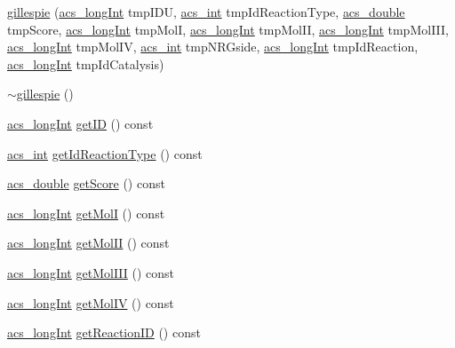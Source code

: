 \begin{DoxyCompactItemize}
\item 
\hyperlink{a00014_a0a38f4fd563208beba389f7f8e8eed4a}{gillespie} (\hyperlink{a00050_a19319d75f02db4308bc5c0026d98cd85}{acs\+\_\+long\+Int} tmp\+I\+D\+U, \hyperlink{a00050_a8d277355641a098190360234e2ebde35}{acs\+\_\+int} tmp\+Id\+Reaction\+Type, \hyperlink{a00050_ab776853a005fcbf56af0424a2a4dd607}{acs\+\_\+double} tmp\+Score, \hyperlink{a00050_a19319d75f02db4308bc5c0026d98cd85}{acs\+\_\+long\+Int} tmp\+Mol\+I, \hyperlink{a00050_a19319d75f02db4308bc5c0026d98cd85}{acs\+\_\+long\+Int} tmp\+Mol\+I\+I, \hyperlink{a00050_a19319d75f02db4308bc5c0026d98cd85}{acs\+\_\+long\+Int} tmp\+Mol\+I\+I\+I, \hyperlink{a00050_a19319d75f02db4308bc5c0026d98cd85}{acs\+\_\+long\+Int} tmp\+Mol\+I\+V, \hyperlink{a00050_a8d277355641a098190360234e2ebde35}{acs\+\_\+int} tmp\+N\+R\+Gside, \hyperlink{a00050_a19319d75f02db4308bc5c0026d98cd85}{acs\+\_\+long\+Int} tmp\+Id\+Reaction, \hyperlink{a00050_a19319d75f02db4308bc5c0026d98cd85}{acs\+\_\+long\+Int} tmp\+Id\+Catalysis)
\item 
\hyperlink{a00014_a33a97651932d8f82d82d164c94a2eae7}{$\sim$gillespie} ()
\item 
\hyperlink{a00050_a19319d75f02db4308bc5c0026d98cd85}{acs\+\_\+long\+Int} \hyperlink{a00014_a6aba3b283efc955bd4869f663ab877d6}{get\+I\+D} () const 
\item 
\hyperlink{a00050_a8d277355641a098190360234e2ebde35}{acs\+\_\+int} \hyperlink{a00014_a25d1e86363cdd7fabbb624b85620d1db}{get\+Id\+Reaction\+Type} () const 
\item 
\hyperlink{a00050_ab776853a005fcbf56af0424a2a4dd607}{acs\+\_\+double} \hyperlink{a00014_aa0ba52c30f6172a034e3b29afd074106}{get\+Score} () const 
\item 
\hyperlink{a00050_a19319d75f02db4308bc5c0026d98cd85}{acs\+\_\+long\+Int} \hyperlink{a00014_a8de52ad4b41daa64e69c897541b69629}{get\+Mol\+I} () const 
\item 
\hyperlink{a00050_a19319d75f02db4308bc5c0026d98cd85}{acs\+\_\+long\+Int} \hyperlink{a00014_a842457bf58d6af34b992a2c3fe27e4f6}{get\+Mol\+I\+I} () const 
\item 
\hyperlink{a00050_a19319d75f02db4308bc5c0026d98cd85}{acs\+\_\+long\+Int} \hyperlink{a00014_ab3d608ab2016a5a06408a76a1d12aabf}{get\+Mol\+I\+I\+I} () const 
\item 
\hyperlink{a00050_a19319d75f02db4308bc5c0026d98cd85}{acs\+\_\+long\+Int} \hyperlink{a00014_a01e1fb80634ae8fd32ce20fd7b5181ba}{get\+Mol\+I\+V} () const 
\item 
\hyperlink{a00050_a19319d75f02db4308bc5c0026d98cd85}{acs\+\_\+long\+Int} \hyperlink{a00014_a8d4daffecd91b32fb59a94eae6de8d0e}{get\+Reaction\+I\+D} () const 

\end{DoxyCompactItemize}
